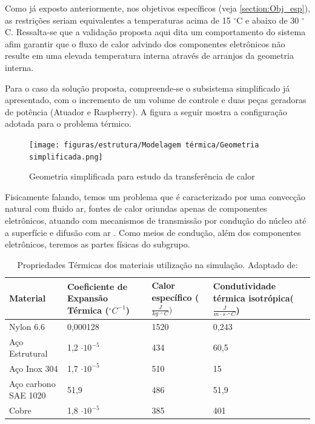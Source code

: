 Como já exposto anteriormente, nos objetivos específicos (veja \ref{section:Obj_esp}), as restrições seriam equivalentes a temperaturas acima de 15 $^{\circ}$C e abaixo de 30 $^{\circ}$C. Ressalta-se que a validação proposta aqui dita um comportamento do sistema afim garantir que o fluxo de calor advindo dos componentes eletrônicos não resulte em uma elevada temperatura interna através de arranjos da geometria interna.

  

Para o caso da solução proposta, compreende-se o subsistema simplificado já apresentado, com o incremento de um volume de controle e duas peças geradoras de potência (Atuador e Raspberry). A figura a seguir mostra a configuração adotada para o problema térmico.

\begin{figure}[ht]
        \centering
        \texttt{[image: figuras/estrutura/Modelagem térmica/Geometria simplificada.png]}
        \caption{Geometria simplificada para estudo da transferência de calor}
        \label{fig:subgrupo_termico}
    \end{figure}

Fisicamente falando, temos um problema que é caracterizado por uma convecção natural com fluido ar, fontes de calor oriundas apenas de componentes eletrônicos, atuando com mecanismos de transmissão por condução do núcleo até a superfície e difusão com ar \cite{transcal}. Como meios de condução, além dos componentes eletrônicos, teremos as partes físicas do subgrupo.

\begin{table}[H]
    \centering
    \caption{Propriedades Térmicas dos materiais utilização na simulação. Adaptado de: \cite{transcal}}
    \label{tab:Propriedadestermicas}
    \begin{adjustbox}{max width = \textwidth}
        \begin{tabular}{|C{2cm}|C{4cm}|C{4cm}|C{4cm}|}
            \hline
            \textbf{Material} & \textbf{Coeficiente de Expansão Térmica ($^{\circ}C^{-1}$)} & \textbf{Calor específico ($\frac{J}{kg\cdot^{\circ}C})$} & \textbf{Condutividade térmica isotrópica($\frac{J}{m\cdot s \cdot ^{\circ}C}$)} \\ \hline
              Nylon 6.6 & 0,000128 & 1520 & 0,243 \\ \hline
              Aço Estrutural  & 1,2 $\cdot10^{-5} $ & 434 & 60,5 \\ \hline
              Aço Inox 304  & 1,7 $\cdot10^{-5} $ & 510 & 15 \\ \hline
              Aço carbono SAE 1020  & 51,9 & 486 & 51,9 \\ \hline
              Cobre  & 1,8 $\cdot10^{-5} $ & 385 & 401 \\\hline
             
        \end{tabular}
    \end{adjustbox}
\end{table}


